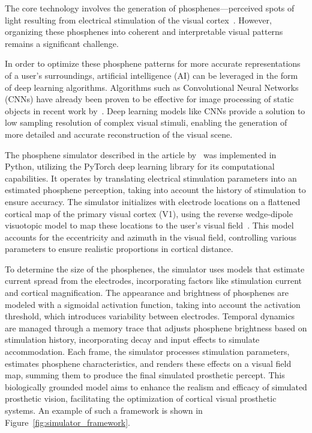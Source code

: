 \documentclass[10pt]{article}
\begin{document}
The core technology involves the generation of phosphenes—perceived spots of
light resulting from electrical stimulation of the visual
cortex~\parencite{vandergrintenBiologicallyPlausiblePhosphene2024}. However,
organizing these phosphenes into coherent and interpretable visual patterns
remains a significant challenge.

In order to optimize these phosphene patterns for more accurate representations
of a user's surroundings, artificial intelligence (AI) can be leveraged in the
form of deep learning algorithms. Algorithms such as Convolutional Neural
Networks (CNNs) have already been proven to be effective for image processing of
static objects in recent work
by~\textcite{deruytervansteveninckEndtoendOptimizationProsthetic2022}. Deep
learning models like CNNs provide a solution to low sampling resolution of
complex visual stimuli, enabling the generation of more detailed and accurate
reconstruction of the visual scene.

The phosphene simulator described in the article
by~\textcite{deruytervansteveninckEndtoendOptimizationProsthetic2022} was
implemented in Python, utilizing the PyTorch deep learning library for its
computational capabilities. It operates by translating electrical stimulation
parameters into an estimated phosphene perception, taking into account the
history of stimulation to ensure accuracy. The simulator initializes with
electrode locations on a flattened cortical map of the primary visual cortex
(V1), using the reverse wedge-dipole visuotopic model to map these locations to
the user's visual field~\parencite{liWearableComputerVision2013}. This model
accounts for the eccentricity and azimuth in the visual field, controlling
various parameters to ensure realistic proportions in cortical distance.

To determine the size of the phosphenes, the simulator uses models that estimate
current spread from the electrodes, incorporating factors like stimulation
current and cortical magnification. The appearance and brightness of phosphenes
are modeled with a sigmoidal activation function, taking into account the
activation threshold, which introduces variability between electrodes. Temporal
dynamics are managed through a memory trace that adjusts phosphene brightness
based on stimulation history, incorporating decay and input effects to simulate
accommodation. Each frame, the simulator processes stimulation parameters,
estimates phosphene characteristics, and renders these effects on a visual field
map, summing them to produce the final simulated prosthetic percept. This
biologically grounded model aims to enhance the realism and efficacy of
simulated prosthetic vision, facilitating the optimization of cortical visual
prosthetic systems. An example of such a framework is shown in Figure~\ref{fig:simulator_framework}.
\end{document}
